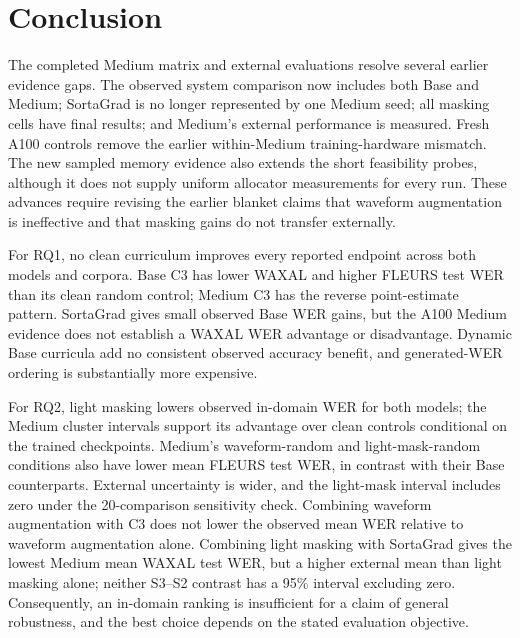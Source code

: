 \documentclass[12pt,a4paper]{report}
\begin{document}
\section{Conclusion}

The completed Medium matrix and external evaluations resolve several earlier
evidence gaps. The observed system comparison now includes both Base and Medium;
SortaGrad is no longer represented by one Medium seed; all masking cells
have final results; and Medium's external performance is measured. Fresh
A100 controls remove the earlier within-Medium training-hardware mismatch.
The new sampled memory evidence also extends the short feasibility probes,
although it does not supply uniform allocator measurements for every run.
These advances require revising the earlier blanket claims that waveform
augmentation is ineffective and that masking gains do not transfer externally.

For RQ1, no clean curriculum improves every reported endpoint across both
models and corpora. Base C3 has lower WAXAL and higher FLEURS test WER than
its clean random control; Medium C3 has the reverse point-estimate pattern.
SortaGrad gives small observed Base WER gains, but the A100 Medium evidence
does not establish a WAXAL WER advantage or disadvantage. Dynamic Base curricula
add no consistent observed accuracy benefit,
and generated-WER ordering is substantially more expensive.

For RQ2, light masking lowers observed in-domain WER for both models; the
Medium cluster intervals support its advantage over clean controls conditional
on the trained checkpoints. Medium's waveform-random and light-mask-random
conditions also have lower mean FLEURS test WER, in contrast with their Base
counterparts. External uncertainty is wider, and the light-mask interval
includes zero under the 20-comparison sensitivity check. Combining waveform
augmentation with C3 does not lower the observed mean WER relative to waveform
augmentation alone.
Combining light masking with SortaGrad gives the lowest Medium mean WAXAL
test WER, but a higher external mean than light masking alone; neither
S3--S2 contrast has a 95\% interval excluding zero.
Consequently, an in-domain ranking is insufficient for a claim of general
robustness, and the best choice depends on the stated evaluation objective.
\end{document}

